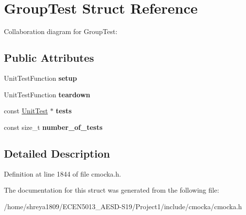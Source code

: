\hypertarget{structGroupTest}{}\section{Group\+Test Struct Reference}
\label{structGroupTest}


Collaboration diagram for Group\+Test\+:
\subsection*{Public Attributes}
\begin{DoxyCompactItemize}
\item 
\mbox{\label{structGroupTest_abb15632448009bde536e8187afa2831d}} 
Unit\+Test\+Function {\bfseries setup}
\item 
\mbox{\label{structGroupTest_a59b4a5d3b725b3f625dee8f7fd55cd30}} 
Unit\+Test\+Function {\bfseries teardown}
\item 
\mbox{\label{structGroupTest_a4365c3917e4b03ac03edbeedc4a24aeb}} 
const \hyperlink{structUnitTest}{Unit\+Test} $\ast$ {\bfseries tests}
\item 
\mbox{\label{structGroupTest_af72995fabd94fe9ef4da280475d26762}} 
const size\+\_\+t {\bfseries number\+\_\+of\+\_\+tests}
\end{DoxyCompactItemize}


\subsection{Detailed Description}


Definition at line 1844 of file cmocka.\+h.



The documentation for this struct was generated from the following file\+:\begin{DoxyCompactItemize}
\item 
/home/shreya1809/\+E\+C\+E\+N5013\+\_\+\+A\+E\+S\+D-\/\+S19/\+Project1/include/cmocka/cmocka.\+h\end{DoxyCompactItemize}
